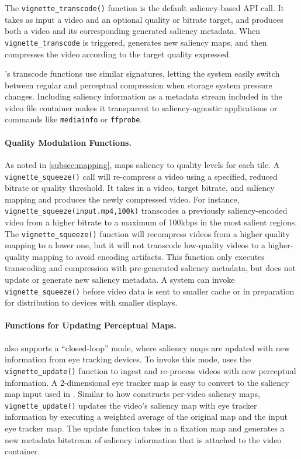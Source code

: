 The \texttt{vignette\_transcode()} function is the default saliency-based API call.
It takes as input a video and an optional quality or bitrate target, and produces both a video and its corresponding generated saliency metadata.
When \texttt{vignette\_transcode} is triggered, \nameStore generates new saliency maps, and then compresses the video according to the target quality expressed.

\nameStore's transcode functions use similar signatures, letting the system easily switch between regular and perceptual compression when storage system pressure changes.
Including saliency information as a metadata stream included in the video file container makes it transparent to saliency-agnostic applications or commands like \texttt{mediainfo} or \texttt{ffprobe}.

\paragraph{Quality Modulation Functions.}
As noted in \ref{subsec:mapping}, \nameCompress maps saliency to quality levels for each tile.
A \texttt{vignette\_squeeze()} call will re-compress a video using a specified, reduced bitrate or quality threshold.
It takes in a video, target bitrate, and saliency mapping and produces the newly compressed video.
For instance, \texttt{vignette\_squeeze(input.mp4,100k)} transcodes a previously saliency-encoded video from a higher bitrate to a maximum of 100kbps in the most salient regions.
The \texttt{vignette\_squeeze()} function will recompress videos from a higher quality mapping to a lower one, but it will not transcode low-quality videos to a higher-quality mapping to avoid encoding artifacts.
This function only executes transcoding and compression with pre-generated saliency metadata, but does not update or generate new saliency metadata.
A system can invoke \texttt{vignette\_squeeze()} before video data is sent to smaller cache or in preparation for distribution to devices with smaller displays.

\paragraph{Functions for Updating Perceptual Maps.}
\nameStore also supports a ``closed-loop'' mode, where saliency maps are updated with new information from eye tracking devices.
To invoke this mode, \nameStore uses the \texttt{vignette\_update()} function to ingest and re-process videos with new perceptual information.
A 2-dimensional eye tracker map is easy to convert to the saliency map input used in \nameCompress.
Similar to how \name constructs per-video saliency maps, \texttt{vignette\_update()} updates the video's saliency map with eye tracker information by executing a weighted average of the original map and the input eye tracker map.
The update function takes in a fixation map and generates a new metadata bitstream of saliency information that is attached to the video container.

